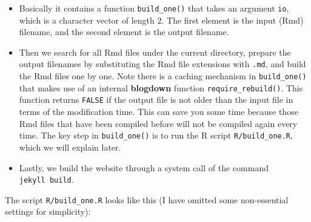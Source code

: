\documentclass[12pt,]{krantz}
\makeatletter
\newenvironment{Shaded}{\begin{snugshade}}{\end{snugshade}}
\newcommand{\CommentTok}[1]{\textcolor[rgb]{0.56,0.35,0.01}{\textit{#1}}}
\newcommand{\DataTypeTok}[1]{\textcolor[rgb]{0.13,0.29,0.53}{#1}}
\newcommand{\DecValTok}[1]{\textcolor[rgb]{0.00,0.00,0.81}{#1}}
\newcommand{\KeywordTok}[1]{\textcolor[rgb]{0.13,0.29,0.53}{\textbf{#1}}}
\newcommand{\NormalTok}[1]{#1}
\newcommand{\OperatorTok}[1]{\textcolor[rgb]{0.81,0.36,0.00}{\textbf{#1}}}
\newcommand{\OtherTok}[1]{\textcolor[rgb]{0.56,0.35,0.01}{#1}}
\newcommand{\StringTok}[1]{\textcolor[rgb]{0.31,0.60,0.02}{#1}}
\newenvironment{kframe}{%
\medskip{}
\setlength{\fboxsep}{.8em}
 \def\at@end@of@kframe{}%
 \ifinner\ifhmode%
  \def\at@end@of@kframe{\end{minipage}}%
  \begin{minipage}{\columnwidth}%
 \fi\fi%
 \def\FrameCommand##1{\hskip\@totalleftmargin \hskip-\fboxsep
 \colorbox{shadecolor}{##1}\hskip-\fboxsep
     \hskip-\linewidth \hskip-\@totalleftmargin \hskip\columnwidth}%
 \MakeFramed {\advance\hsize-\width
   \@totalleftmargin\z@ \linewidth\hsize
   \@setminipage}}%
 {\par\unskip\endMakeFramed%
 \at@end@of@kframe}
\renewenvironment{Shaded}{\begin{kframe}}{\end{kframe}}
\theoremstyle{definition}
\theoremstyle{definition}
\theoremstyle{definition}
\theoremstyle{remark}
\makeatother
\begin{document}
\begin{itemize}
\item
  Basically it contains a function
  \texttt{build\_one()} that takes an argument \texttt{io}, which is a
  character vector of length 2. The first element is the input (Rmd)
  filename, and the second element is the output filename.
\item
  Then we search for all Rmd files under the current directory, prepare
  the output filenames by substituting the Rmd file extensions with
  \texttt{.md}, and build the Rmd files one by one. Note there is a
  caching mechanism in \texttt{build\_one()} that makes use of an
  internal \textbf{blogdown} function \texttt{require\_rebuild()}. This
  function returns \texttt{FALSE} if the output file is not older than
  the input file in terms of the modification time. This can save you
  some time because those Rmd files that have been compiled before will
  not be compiled again every time. The key step in
  \texttt{build\_one()} is to run the R script \texttt{R/build\_one.R},
  which we will explain later.
\item
  Lastly, we build the website through a system call of the command
  \texttt{jekyll\ build}.
\end{itemize}

The script \texttt{R/build\_one.R} looks like this (I have omitted some
non-essential settings for simplicity):

\begin{Shaded}
\end{Shaded}
\end{document}

